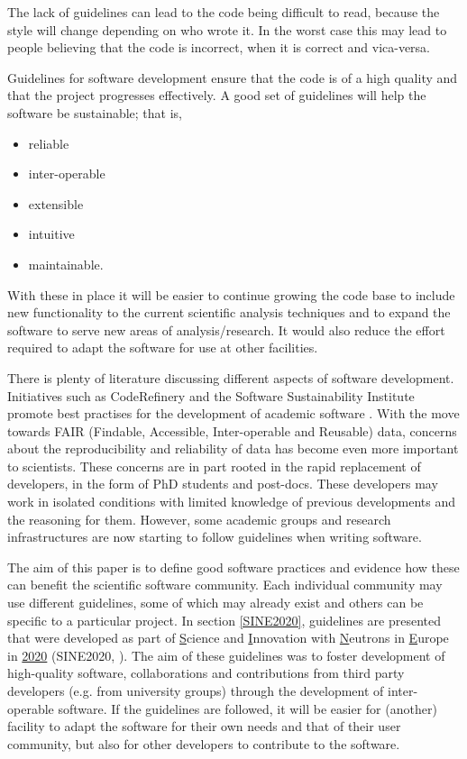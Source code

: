 \documentclass[jnr]{iosart2x}
\begin{document}
The lack of guidelines can lead to the code being difficult to read, because the style will change depending on who wrote it.
In the worst case this may lead to people believing that the code is incorrect, when it is correct and vica-versa.

Guidelines for software development ensure that the code is of a high quality and that the project progresses effectively.
A good set of guidelines will help the software be sustainable; that is,
\begin{itemize}
\item{reliable}
\item{inter-operable}
\item{extensible}
\item{intuitive}
\item{maintainable.}
\end{itemize}

With these in place it will be easier to continue growing the code base to include new functionality to the current scientific analysis techniques and to expand the software to serve new areas of analysis/research.
It would also reduce the effort required to adapt the software for use at other facilities.

There is plenty of literature discussing different aspects of software development.
Initiatives such as CodeRefinery \cite{coderefinery} and the Software Sustainability Institute \cite{SoftwareSustainabilityInstitute} promote best practises for the development of academic software \cite{fair_software}.
With the move towards FAIR (Findable, Accessible, Inter-operable and Reusable) \cite{panosc} data, concerns about the reproducibility and reliability of data has become even more important to scientists.
These concerns are in part rooted in the rapid replacement of developers, in the form of PhD students and post-docs.
These developers may work in isolated conditions with limited knowledge of previous developments and the reasoning for them.
However, some academic groups and research infrastructures are now starting to follow guidelines when writing software.

The aim of this paper is to define good software practices and evidence how these can benefit the scientific software community.
Each individual community may use different guidelines, some of which may already exist and others can be specific to a particular project.
In section \ref{SINE2020}, guidelines are presented that were developed as part of \underline{S}cience and \underline{I}nnovation with \underline{N}eutrons in \underline{E}urope in \underline{2020} (SINE2020, \cite{sine2020}).
The aim of these guidelines was to foster development of high-quality software, collaborations and contributions from third party developers (e.g. from university groups) through the development of inter-operable software.
If the guidelines are followed, it will be easier for (another) facility to adapt the software for their own needs and that of their user community, but also for other developers to contribute to the software.
\end{document}
